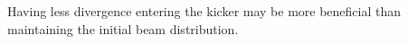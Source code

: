 Having less divergence entering the kicker may be more beneficial than 
maintaining the initial beam distribution. 

 

